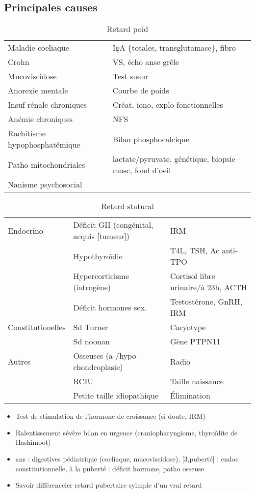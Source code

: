 \documentclass[11pt]{article}
\begin{document}
\subsection{Principales causes}
\label{sec:org05a7fe2}
\begin{table}[htbp]
\caption{Retard poid}
\centering
\begin{tabular}{ll}
\toprule
Maladie coeliaque & IgA \{totales, transglutamase\}, fibro\\
Crohn & VS, écho anse grêle\\
Mucoviscidose & Test sueur\\
Anorexie mentale & Courbe de poids\\
Insuf rénale chroniques & Créat, iono, explo fonctionnelles\\
Anémie chroniques & NFS\\
Rachitisme hypophosphatémique & Bilan phosphocalcique\\
Patho mitochondriales & lactate/pyruvate, génétique, biopsie musc, fond d'oeil\\
Nanisme psychosocial & \\
\bottomrule
\end{tabular}
\end{table}

\begin{table}[htbp]
\caption{Retard statural}
\centering
\begin{tabular}{lll}
\toprule
Endocrino & Déficit GH (congénital, acquis [tumeur]) & IRM\\
 & Hypothyroïdie & T4L, TSH, Ac anti-TPO\\
 & Hypercorticisme (iatrogène) & Cortisol libre urinaire/à 23h, ACTH\\
 & Déficit hormones sex. & Testostérone, GnRH, IRM\\
\midrule
Constitutionelles & Sd Turner & Caryotype\\
 & Sd noonan & Gène PTPN11\\
\midrule
Autres & Osseuses (a-/hypo-chondroplasie) & Radio\\
 & RCIU & Taille naissance\\
 & Petite taille idiopathique & Élimination\\
\bottomrule
\end{tabular}
\end{table}

\begin{itemize}
\item Test de stimulation de l'hormone de croissance (\danger si doute, IRM)
\item Ralentissement sévère \thus bilan en urgence (craniopharyngiome, thyroïdite de
Hashimoot) \skull
\item\relax [0, 3] ans : digestives pédiatrique (coeliaque, mucoviscidose), [3,puberté] :
endoc constitutionnelle, à la puberté : déficit hormone, patho osseuse
\item Savoir différenceier retard pubertaire syimple d'un vrai  retard
\end{itemize}
\end{document}
